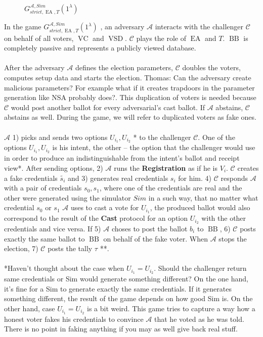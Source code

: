 \documentclass[12pt]{article}
\DeclareMathOperator{\vsd}{VSD}
\DeclareMathOperator{\ea}{EA}
\DeclareMathOperator{\bb}{BB}
\DeclareMathOperator{\voc}{VC}
\begin{document}
   \begin{figure}[h!]
 
        \caption{$G_{strict,\ea,T}^{\mathcal{A}, Sim}(1^{\lambda})$}
        \label{EAT is honest}
\end{figure}
In the game   $G_{strict,\ea,T}^{\mathcal{A}, Sim}(1^{\lambda})$ , an adversary $\mathcal{A}$ interacts with the challenger $\mathcal{C}$ on behalf of all voters, $\voc$ and $\vsd$. $\mathcal{C}$ plays the role of $\ea$ and $T$. $\bb$ is completely passive and represents a publicly viewed database. \\\\
After the adversary  $\mathcal{A}$  defines the election parameters, $\mathcal{C}$  doubles the voters, computes setup data and starts the election. {\color{red} Thomas: Can the adversary create malicious parameters? For example what if it creates trapdoors in the parameter generation like NSA probably does?}. This duplication of voters is needed because $\mathcal{C}$ would post another ballot for every adversarial's cast ballot. If $\mathcal{A}$ abstains, $\mathcal{C}$ abstains as well. During the game, we will refer to duplicated voters as fake ones. \\\\
$\mathcal{A}$ 1) picks and sends two options $U_{i_1},U_{i_2}$ {\color{red}*} to the challenger $\mathcal{C}$. One of the options $U_{i_1}, U_{i_2}$ is his intent, the other -- the option that the challenger would use in order to produce an indistinguishable from the intent's ballot and receipt view*. After sending options, 2) $\mathcal{A}$ runs the   \textbf{Registration} as if he is $V_i$. $\mathcal{C}$ creates a fake credentials $\tilde{s_i}$ and 3) generates real credentials $s_i$ for him. 4) $\mathcal{C}$ responds $\mathcal{A}$ with a pair of credentials $s_0,s_1$, where one of the credentials are real and the other were generated using the simulator $Sim$ in a such way, that no matter what credential $s_0$ or $s_1$ $\mathcal{A}$ uses to cast a vote for $U_{i_1}$, the produced ballot would also correspond to the result of the \textbf{Cast} protocol for an option $U_{i_2}$ with the other credentials and vice versa. If 5) $\mathcal{A}$ choses to post the ballot $b_i$ to $\bb$, 6) $\mathcal{C}$  posts exactly the same ballot to $\bb$ on behalf of the fake voter. When $\mathcal{A}$ stops the election, 7) $\mathcal{C}$ posts the tally $\tau$ **. \\\\
{\color{blue} *Haven't thought about the case when  $U_{i_1} = U_{i_2}$. Should the challenger return same credentials or Sim would generate something different? On the one hand, it's fine for a Sim to generate exactly the same credentials. If it generates something different, the result of the game depends on how good Sim is. On the other hand, case $U_{i_1} = U_{i_2}$ is a bit weird. This game tries to capture a way how a honest voter fakes his credentials to convince $\mathcal{A}$ that he voted as he was told. There is no point in faking anything if you may as well give back real stuff. } \\
\end{document}
